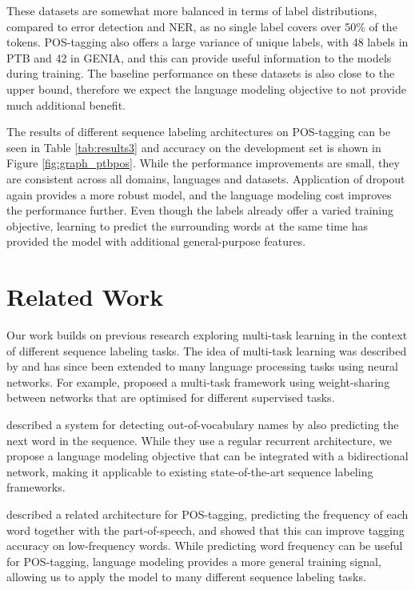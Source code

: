 \documentclass[11pt,a4paper]{article}
\begin{document}
These datasets are somewhat more balanced in terms of label distributions, compared to error detection and NER, as no single label covers over 50\% of the tokens. POS-tagging also offers a large variance of unique labels, with 48 labels in PTB and 42 in GENIA, and this can provide useful information to the models during training. The baseline performance on these datasets is also close to the upper bound, therefore we expect the language modeling objective to not provide much additional benefit.

The results of different sequence labeling architectures on POS-tagging can be seen in Table \ref{tab:results3} and accuracy on the development set is shown in Figure \ref{fig:graph_ptbpos}. While the performance improvements are small, they are consistent across all domains, languages and datasets. Application of dropout again provides a more robust model, and the language modeling cost improves the performance further. 
Even though the labels already offer a varied training objective, learning to predict the surrounding words at the same time has provided the model with additional general-purpose features.






\section{Related Work}

Our work builds on previous research exploring multi-task learning in the context of different sequence labeling tasks.
The idea of multi-task learning was described by  and has since been extended to many language processing tasks using neural networks.
For example,  proposed a multi-task framework using weight-sharing between networks that are optimised for different supervised tasks.

 described a system for detecting out-of-vocabulary names by also predicting the next word in the sequence.
While they use a regular recurrent architecture, we propose a language modeling objective that can be integrated with a bidirectional network, making it applicable to existing state-of-the-art sequence labeling frameworks.

 described a related architecture for POS-tagging, predicting the frequency of each word together with the part-of-speech, and showed that this can improve tagging accuracy on low-frequency words.
While predicting word frequency can be useful for POS-tagging, language modeling provides a more general training signal, allowing us to apply the model to many different sequence labeling tasks.
\end{document}
